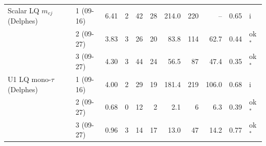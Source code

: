 \begin{tabular}{llrrrrrrrrl}
Scalar LQ $m_{ej}$ (Delphes) & 1 (09-16) & 6.41 & 2 & 42 & 28 & 214.0 & 220 & -- & 0.65 & i \\
 & 2 (09-27) & 3.83 & 3 & 26 & 20 & 83.8 & 114 & 62.7 & 0.44 & ok$^{*}$ \\
 & 3 (09-27) & 4.30 & 3 & 44 & 24 & 56.5 & 87 & 47.4 & 0.35 & ok$^{*}$ \\
U1 LQ mono-$\tau$ (Delphes) & 1 (09-16) & 4.00 & 2 & 29 & 19 & 181.4 & 219 & 106.0 & 0.68 & i \\
 & 2 (09-27) & 0.68 & 0 & 12 & 2 & 2.1 & 6 & 6.3 & 0.39 & ok$^{*}$ \\
 & 3 (09-27) & 0.96 & 3 & 14 & 17 & 13.0 & 47 & 14.2 & 0.77 & ok$^{*}$ \\
\bottomrule
\end{tabular}
